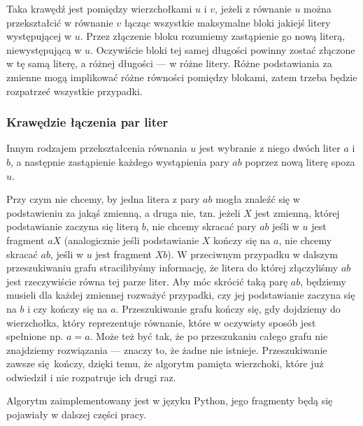 \documentclass[leqno, 12pt]{article}
\begin{document}
Taka krawędź jest pomiędzy wierzchołkami $u$ i $v$, jeżeli z równanie $u$ można przekształcić w równanie $v$ łącząc wszystkie maksymalne bloki jakiejś litery występującej w $u$. Przez złączenie bloku rozumiemy zastąpienie go nową literą, niewystępującą w $u$. Oczywiście bloki tej samej długości powinny zostać złączone w tę samą literę, a różnej długości --- w różne litery.
Różne podstawiania za zmienne mogą implikować różne równości pomiędzy blokami, zatem trzeba będzie rozpatrzeć wszystkie przypadki.


\subsubsection*{Krawędzie łączenia par liter}
Innym rodzajem przekształcenia równania $u$ jest wybranie z niego dwóch liter $a$ i $b$, a następnie zastąpienie każdego wystąpienia pary $ab$ poprzez nową literę spoza $u$.


Przy czym nie chcemy, by jedna litera z pary $ab$ mogła znaleźć się w podstawieniu za jakąś zmienną, a druga nie, tzn. jeżeli $X$ jest zmienną, której podstawianie zaczyna się literą $b$, nie chcemy skracać pary $ab$ jeśli w $u$ jest fragment $aX$ (analogicznie jeśli podstawianie $X$ kończy się na $a$, nie chcemy skracać $ab$, jeśli w $u$ jest fragment $Xb$). W przeciwnym przypadku w dalszym przeszukiwaniu grafu stracilibyśmy informację, że litera do której złączyliśmy $ab$ jest rzeczywiście równa tej parze liter. Aby móc skrócić taką parę $ab$, będziemy musieli dla każdej zmiennej rozważyć przypadki, czy jej podstawianie zaczyna się na $b$ i czy kończy się na $a$.
\newline\newline
Przeszukiwanie grafu kończy się, gdy dojdziemy do wierzchołka, który reprezentuje równanie, które w oczywisty sposób jest spełnione np. $a=a$. Może też być tak, że po przeszukaniu całego grafu nie znajdziemy rozwiązania --- znaczy to, że żadne nie istnieje. Przeszukiwanie zawsze się kończy, dzięki temu, że algorytm pamięta wierzchoki, które już odwiedził i nie rozpatruje ich drugi raz.



Algorytm zaimplementowany jest w języku Python, jego fragmenty będą się pojawiały w dalszej części pracy.
\end{document}
